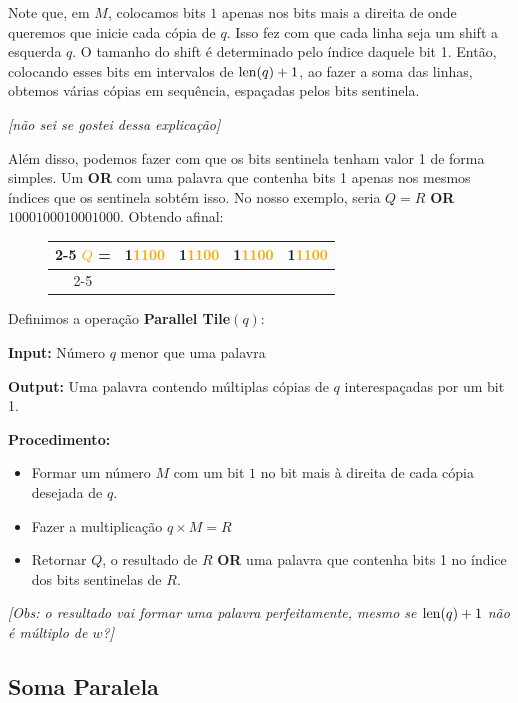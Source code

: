 Note que, em $M$, colocamos bits $1$ apenas nos bits mais a direita de onde
queremos que inicie cada cópia de $q$. Isso fez com que cada linha seja um shift
a esquerda $q$. O tamanho do shift é determinado pelo índice daquele bit 1.
Então, colocando esses bits em intervalos de $\operatorname{len}(q)+1$, ao fazer a soma das
linhas, obtemos várias cópias em sequência, espaçadas pelos bits sentinela.

\textit{[não sei se gostei dessa explicação]}

Além disso, podemos fazer com que os bits sentinela tenham valor 1 de forma
simples. Um \textbf{OR} com uma palavra que contenha bits 1 apenas nos mesmos
índices que os sentinela sobtém isso. No nosso exemplo, seria $Q = R$
\textbf{OR} $1000100010001000$. Obtendo afinal:


\begin{figure}[h]
\bf \Large \centering
\begin{tabular}{c|cccc|}
\cline{2-5}
\textcolor{Orange}{$Q$} = &
\textcolor{RawSienna}{1}\textcolor{Orange}{1100} &
\textcolor{RawSienna}{1}\textcolor{Orange}{1100} &
\textcolor{RawSienna}{1}\textcolor{Orange}{1100} & \textcolor{RawSienna}{1}\textcolor{Orange}{1100} \\
\cline{2-5}
\end{tabular}
\end{figure}

Definimos a operação \textbf{Parallel Tile}$(q)$:

\textbf{Input:} Número $q$ menor que uma palavra

\textbf{Output:} Uma palavra contendo múltiplas cópias de $q$ interespaçadas por
um bit 1.

\textbf{Procedimento:} 
\begin{itemize}
    \item Formar um número $M$ com um bit $1$ no bit mais à direita de cada
    cópia desejada de $q$. 
    \item Fazer a multiplicação $q \times M = R$
    \item Retornar $Q$, o resultado de $R$ \textbf{OR} uma palavra que contenha
    bits 1 no índice dos bits sentinelas de $R$. 
\end{itemize} 

\textit{[Obs: o resultado vai formar uma palavra perfeitamente, mesmo se $\operatorname{len}(q)+1$ não é múltiplo de $w$?]}

\subsection{Soma Paralela}

